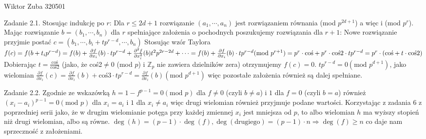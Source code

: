 \documentclass{article}
\begin{document}
Wiktor Zuba 320501
\newline

Zadanie 2.1.
\newline
\newline
Stosując indukcję po $r$:\newline
Dla $r\le 2d+1$ rozwiązanie $(a_1,\cdots,a_n)$ jest rozwiązaniem równania (mod $p^{2d+1}$) a więc i (mod $p^{r}$).\newline
Mając rozwiązanie $b=(b_1,\cdots, b_n)$ dla $r$ spełniające założenia o pochodnych poszukujemy rozwiązania dla $r+1$:\newline
Nowe rozwiązanie przyjmie postać $c=(b_1,\cdots,b_i+tp^{r-d},\cdots,b_n)$\newline
Stosując wzór Taylora\newline
$f(c)=f(b+t_ip^{r-d})=f(b)+\frac{\partial f}{\partial x_i}(b)\cdot tp^{r-d}+\frac{\partial^2 f}{\partial x_i^2}(b)t^2p^{2r-2d}+\cdots=
f(b)+\frac{\partial f}{\partial x_i}(b)\cdot tp^{r-d}(\text{mod } p^{r+1})\newline
=p^r\cdot\text{coś}+p^r\cdot\text{coś2}\cdot tp^{r-d}=p^r\cdot(\text{coś}+t\cdot\text{coś2})$\newline
Dobierając $t=\frac{\text{coś}}{\text{coś2}}$ (jako, że coś2$\neq0$ (mod $p$) i $\mathbb{Z}_p$ nie zawiera dzielników zera) otrzymujemy $f(c)=0$.\newline
$tp^{r-d}=0 (\text{mod }p^{d+1})$,
jako wielomian $\frac{\partial f}{\partial x_i}(c)=\frac{\partial f}{\partial x_i}(b)+\text{coś3}\cdot tp^{r-d}=\frac{\partial f}{\partial x_i}(b)(\text{mod }p^{d+1})$\newline
więc pozostałe założenia również są dalej spełniane.
\newline

Zadanie 2.2.
\newline
\newline
Zgodnie ze wskazówką $h=1-f^{p-1}=0(\text{mod }p)$ dla $f\neq0$ (czyli $b\neq a$) i $1$ dla $f=0$ (czyli $b=a$) również $(x_i-a_i)^{p-1}=0(\text{mod }p)$ dla $x_i=a_i$ i $1$ dla $x_i\neq a_i$
więc drugi wielomian również przyjmuje podane wartości. Korzystając z zadania 6 z poprzedniej serii jako, że w drugim wielomianie potęga przy każdej zmiennej $x_i$ jest mniejsza od $p$, to
albo wielomian $h$ ma wyższy stopień niż drugi wielomian, albo są równe.\newline
$\deg(h)=(p-1)\cdot\deg(f), \deg(\text{drugiego})=(p-1)\cdot n\Rightarrow \deg(f)\ge n$ co daje nam sprzeczność z założeniami. 
\newline
\end{document}
